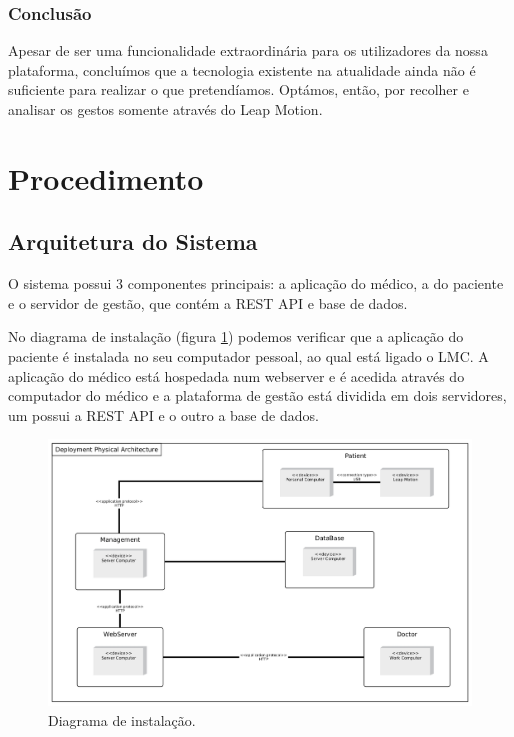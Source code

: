 \documentclass{TTUPhD}
\begin{document}
\subsubsection{Conclusão}

Apesar de ser uma funcionalidade extraordinária para os utilizadores da nossa plataforma, concluímos que a tecnologia existente na atualidade
ainda não é suficiente para realizar o que pretendíamos. Optámos, então, por recolher e analisar os gestos somente através do Leap Motion.

\section{Procedimento}

\subsection{Arquitetura do Sistema}

O sistema possui 3 componentes principais: a aplicação do médico, a do paciente e o servidor de gestão, que contém a REST API e base de dados.

No diagrama de instalação (figura \ref{fig:deployment}) podemos verificar que a aplicação do paciente é instalada no seu computador pessoal, ao qual
está ligado o LMC. A aplicação do médico está hospedada num webserver e é acedida através do computador do médico e a plataforma de gestão está dividida
em dois servidores, um possui a REST API e o outro a base de dados.

\begin{figure}[h!]
    \center
    \includegraphics[scale=0.15]{./img/deployment.jpg}
    \caption{Diagrama de instalação.}
    \label{fig:deployment}
\end{figure}
\end{document}

